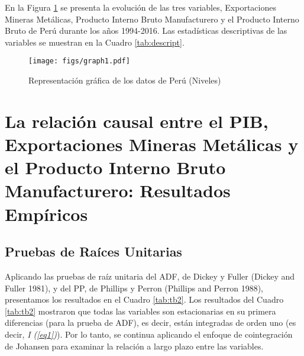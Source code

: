 \documentclass[11pt,]{article}
\begin{document}
En la Figura \ref{fig:plot1} se presenta la evolución de las tres
variables, Exportaciones Mineras Metálicas, Producto Interno Bruto
Manufacturero y el Producto Interno Bruto de Perú durante los años
1994-2016. Las estadísticas descriptivas de las variables se muestran en
la Cuadro \ref{tab:descript}.

\begin{figure}
\centering
\texttt{[image: figs/graph1.pdf]}
\caption{\label{fig:plot1} Representación gráfica de los datos de Perú
(Niveles)}
\end{figure}

\hypertarget{la-relacion-causal-entre-el-pib-exportaciones-mineras-metalicas-y-el-producto-interno-bruto-manufacturero-resultados-empiricos}{%
\section{La relación causal entre el PIB, Exportaciones Mineras
Metálicas y el Producto Interno Bruto Manufacturero: Resultados
Empíricos}\label{la-relacion-causal-entre-el-pib-exportaciones-mineras-metalicas-y-el-producto-interno-bruto-manufacturero-resultados-empiricos}}

\hypertarget{pruebas-de-raices-unitarias}{%
\subsection{Pruebas de Raíces
Unitarias}\label{pruebas-de-raices-unitarias}}

Aplicando las pruebas de raíz unitaria del ADF, de Dickey y Fuller
(Dickey and Fuller 1981), y del PP, de Phillips y Perron (Phillips and
Perron 1988), presentamos los resultados en el Cuadro \ref{tab:tb2}. Los
resultados del Cuadro \ref{tab:tb2} mostraron que todas las variables
son estacionarias en su primera diferencias (para la prueba de ADF), es
decir, están integradas de orden uno (es decir, \emph{I (\ref{eq1})}).
Por lo tanto, se continua aplicando el enfoque de cointegración de
Johansen para examinar la relación a largo plazo entre las variables.
\end{document}
